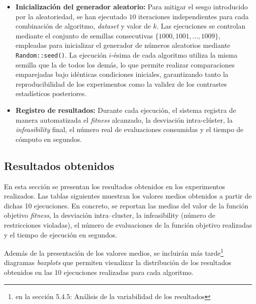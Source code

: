 \documentclass[a4paper,12pt]{article}%
\begin{document}
\begin{itemize}
	\item \textbf{Inicialización del generador aleatorio:} Para mitigar el sesgo introducido por la aleatoriedad, se han ejecutado $10$ iteraciones independientes para cada combinación de algoritmo, \textit{dataset} y valor de $k$. Las ejecuciones se	controlan mediante el conjunto de semillas consecutivas $\{1000, 1001, \dots, 1009\}$,	empleadas para inicializar el generador de números aleatorios mediante \texttt{Random::seed()}. La ejecución $i$-ésima de cada algoritmo utiliza la misma semilla que la de todos los demás, lo que permite realizar comparaciones emparejadas bajo idénticas condiciones iniciales, garantizando tanto la reproducibilidad de los experimentos como la validez de los contrastes estadísticos posteriores.
	
	\item \textbf{Registro de resultados:} Durante cada ejecución, el sistema registra de manera automatizada el \textit{fitness} alcanzado, la desviación intra-clúster, la \textit{infeasibility} final, el número real de evaluaciones consumidas y el tiempo de cómputo en segundos.	
\end{itemize}


\subsection{Resultados obtenidos}

\noindent En esta sección se presentan los resultados obtenidos en los experimentos realizados. Las tablas siguientes muestran los valores medios obtenidos a partir de dichas 10 ejecuciones. En concreto, se reportan las medias del valor de la función objetivo \textit{fitness}, la desviación intra--cluster, la infeasibility (número de restricciones violadas), el número de evaluaciones de la función objetivo realizadas y el tiempo de ejecución en segundos.

Además de la presentación de los valores medios, se incluirán más tarde\footnote{en la sección 5.4.5: Análisis de la variabilidad de los resultados} diagramas \textit{boxplots} que permiten visualizar la distribución de los resultados obtenidos en las 10 ejecuciones realizadas para cada algoritmo.
\end{document}
